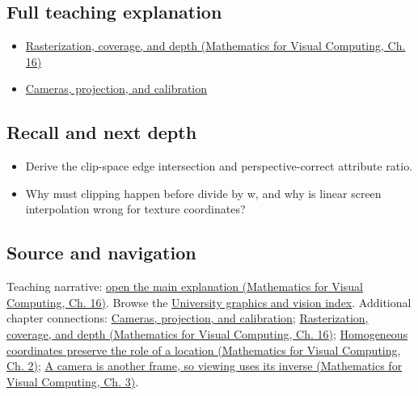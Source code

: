 \subsection{Full teaching explanation}\label{appendix-40426e4b2103-full-teaching-explanation}

\begin{itemize}
\tightlist
\item
  \href{../02-Mathematics-for-Visual-Computing/main.pdf\#nameddest=03-visual-computing-i-ch012-rasterization-coverage-and-depth}{Rasterization, coverage, and depth (Mathematics for Visual Computing, Ch. 16)}
\item
  \hyperref[03-visual-computing-i-ch003-cameras-projection-and-calibration]{Cameras, projection, and calibration}
\end{itemize}

\subsection{Recall and next depth}\label{appendix-40426e4b2103-recall-and-next-depth}

\begin{itemize}
\tightlist
\item
  Derive the clip-space edge intersection and perspective-correct attribute ratio.
\item
  Why must clipping happen before divide by w, and why is linear screen interpolation wrong for texture coordinates?
\end{itemize}

\subsection{Source and navigation}\label{appendix-40426e4b2103-source-and-navigation}

Teaching narrative: \href{../02-Mathematics-for-Visual-Computing/main.pdf\#nameddest=03-visual-computing-i-ch012-rasterization-coverage-and-depth}{open the main explanation (Mathematics for Visual Computing, Ch. 16)}. Browse the \hyperref[appendix-a6d556a4ef50-university-graphics-vision-and-photography---independent-series]{University graphics and vision index}. Additional chapter connections: \hyperref[03-visual-computing-i-ch003-cameras-projection-and-calibration]{Cameras, projection, and calibration}; \href{../02-Mathematics-for-Visual-Computing/main.pdf\#nameddest=03-visual-computing-i-ch012-rasterization-coverage-and-depth}{Rasterization, coverage, and depth (Mathematics for Visual Computing, Ch. 16)}; \href{../02-Mathematics-for-Visual-Computing/main.pdf\#nameddest=01-foundations-i-ch018-homogeneous-coordinates-preserve-the-role-of-a-location}{Homogeneous coordinates preserve the role of a location (Mathematics for Visual Computing, Ch. 2)}; \href{../02-Mathematics-for-Visual-Computing/main.pdf\#nameddest=01-foundations-i-ch019-a-camera-is-another-frame-so-viewing-uses-its-inverse}{A camera is another frame, so viewing uses its inverse (Mathematics for Visual Computing, Ch. 3)}.

